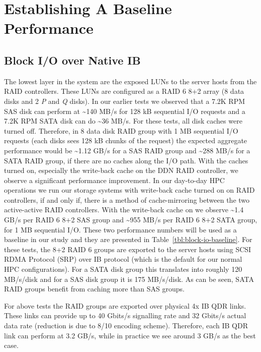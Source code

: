 \section{Establishing A Baseline Performance}
\label{sec:baseline}

\subsection{Block I/O over Native IB} 
\label{sec:block-io}

The lowest layer in the system are the exposed LUNs to the server hosts from
the RAID controllers.  These LUNs are configured as a RAID 6 8+2 array (8 data
disks and 2 \textit{P} and \textit{Q} disks). In our earlier tests we observed
that a 7.2K RPM SAS disk can perform at \textasciitilde140 MB/s for 128 kB
sequential I/O requests and a 7.2K RPM SATA disk can do \textasciitilde36 MB/s.
For these tests, all disk caches were turned off. Therefore, in 8 data disk
RAID group with 1 MB sequential I/O requests (each disks sees 128 kB chunks of
the request) the expected aggregate performance would be \textasciitilde1.12
GB/s for a SAS RAID group and \textasciitilde288 MB/s for a SATA RAID group, if
there are no caches along the I/O path.  With the caches turned on, especially
the write-back cache on the DDN RAID controller, we observe a significant
performance improvement. In our day-to-day HPC operations we run our storage
systems with write-back cache turned on on RAID controllers, if and only if,
there is a method of cache-mirroring between the two active-active RAID
controllers. With the write-back cache on we observe \textasciitilde1.4 GB/s
per RAID 6 8+2 SAS group and  \textasciitilde955 MB/s per RAID 6 8+2 SATA
group, for 1 MB sequential I/O.  These two performance numbers will be used as
a baseline in our study and they are presented in
Table~\ref{tbl:block-io-baseline}.  For these tests, the 8+2 RAID 6 groups are
exported to the server hosts using SCSI RDMA Protocol (SRP) over IB protocol
(which is the default for our normal HPC configurations). For a SATA disk group
this translates into roughly 120 MB/s/disk and for a SAS disk group it is 175
MB/s/disk. As can be seen, SATA RAID groups benefit from caching more than SAS
groups. 

For above tests the RAID groups are exported over physical 4x IB QDR links.
These links can provide up to 40 Gbits/s signalling rate and 32 Gbits/s actual
data rate (reduction is due to 8/10 encoding scheme). Therefore, each IB QDR
link can perform at 3.2 GB/s, while in practice we see around 3 GB/s as the
best case. 

